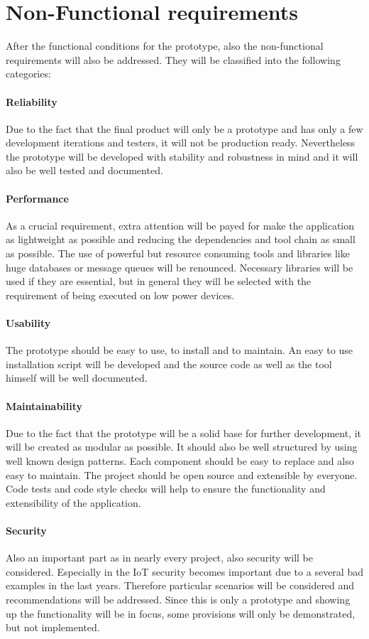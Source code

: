 \section{Non-Functional requirements}
\label{section:non-functional-requirements}
After the functional conditions for the prototype, also the non-functional requirements will also be addressed.
They will be classified into the following categories:

\paragraph{Reliability} Due to the fact that the final product will only be a prototype and has only a few development iterations and testers, it will not be production ready. Nevertheless the prototype will be developed with stability and robustness in mind and it will also be well tested and documented.
\paragraph{Performance} As a crucial requirement, extra attention will be payed for make the application as lightweight as possible and reducing the dependencies and tool chain as small as possible.
The use of powerful but resource consuming tools and libraries like huge databases or message queues will be renounced.
Necessary libraries will be used if they are essential, but in general they will be selected with the requirement of being executed on low power devices.
\paragraph{Usability} The prototype should be easy to use, to install and to maintain.
An easy to use installation script will be developed and the source code as well as the tool himself will be well documented.
\paragraph{Maintainability} Due to the fact that the prototype will be a solid base for further development, it will be created as modular as possible.
It should also be well structured by using well known design patterns.
Each component should be easy to replace and also easy to maintain.
The project should be open source and extensible by everyone.
Code tests and code style checks will help to ensure the functionality and extensibility of the application.
\paragraph{Security} Also an important part as in nearly every project, also security will be considered.
Especially in the \ac{IoT} security becomes important due to a several bad examples in the last years.%
Therefore particular scenarios will be considered and recommendations will be addressed.
Since this is only a prototype and showing up the functionality will be in focus, some provisions will only be demonstrated, but not implemented.

